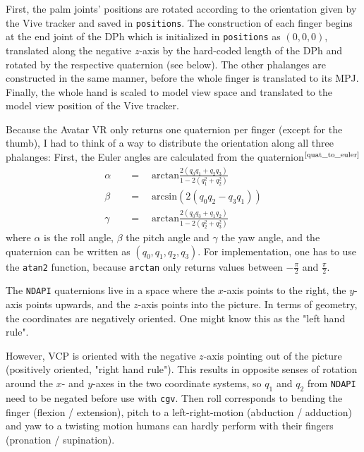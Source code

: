 \documentclass[hyperref, bachelorofscience]{cgvpub}
\newcommand{\newcite}[1]{$ ^{\text{\cite{#1}}} $}
\begin{document}
First, the palm joints' positions are rotated according to the orientation given by the Vive tracker and saved in \lstinline|positions|. The construction of each finger begins at the end joint of the \gls{DPh} which is initialized in \lstinline|positions| as $ (0, 0, 0) $, translated along the negative $ z $-axis by the hard-coded length of the \gls{DPh} and rotated by the respective quaternion (see below). The other phalanges are constructed in the same manner, before the whole finger is translated to its \gls{MPJ}. Finally, the whole hand is scaled to model view space and translated to the model view position of the Vive tracker.

Because the Avatar VR only returns one quaternion per finger (except for the thumb), I had to think of a way to distribute the orientation along all three phalanges: First, the Euler angles are calculated from the quaternion\newcite{quat_to_euler}
\begin{align*}
\alpha \quad&=\quad \mbox{arctan} \frac {2(q_0 q_1 + q_2 q_3)} {1 - 2(q_1^2 + q_2^2)} \\
\beta \quad&=\quad \mbox{arcsin} (2(q_0 q_2 - q_3 q_1)) \\
\gamma \quad&=\quad \mbox{arctan} \frac {2(q_0 q_3 + q_1 q_2)} {1 - 2(q_2^2 + q_3^2)}
\end{align*}
where $ \alpha $ is the roll angle, $ \beta $ the pitch angle and $ \gamma $ the yaw angle, and the quaternion can be written as $ (q_{0}, q_{1}, q_{2}, q_{3}) $. For implementation, one has to use the \lstinline|atan2| function, because \lstinline|arctan| only returns values between $ -\frac{\pi}{2} $ and $ \frac{\pi}{2} $.

The \lstinline|NDAPI| quaternions live in a space where the $ x $-axis points to the right, the $ y $-axis points upwards, and the $ z $-axis points into the picture. In terms of geometry, the coordinates are negatively oriented. One might know this as the "left hand rule". 

However, \gls{VCP} is oriented with the negative $ z $-axis pointing out of the picture (positively oriented, "right hand rule"). This results in opposite senses of rotation around the $ x $- and $ y $-axes in the two coordinate systems, so $ q_{1} $ and $ q_{2} $ from \lstinline|NDAPI| need to be negated before use with \lstinline|cgv|. Then roll corresponds to bending the finger (flexion / extension), pitch to a left-right-motion (abduction / adduction) and yaw to a twisting motion humans can hardly perform with their fingers (pronation / supination).
\end{document}
